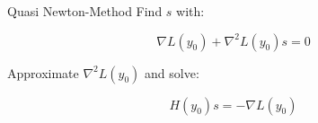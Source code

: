 \begin{frame}{Quasi Newton-Method}
Find $s$ with:
\begin{block}{}
\[ \nabla L(y_{0}) + \nabla^2 L(y_0) s = 0 \]
\end{block} 
\vspace{1em}
Approximate $\nabla^2 L(y_0)$ and solve:
\begin{block}{}
\[ H(y_0) s = -\nabla L(y_{0}) \]
\end{block} 
\end{frame}

